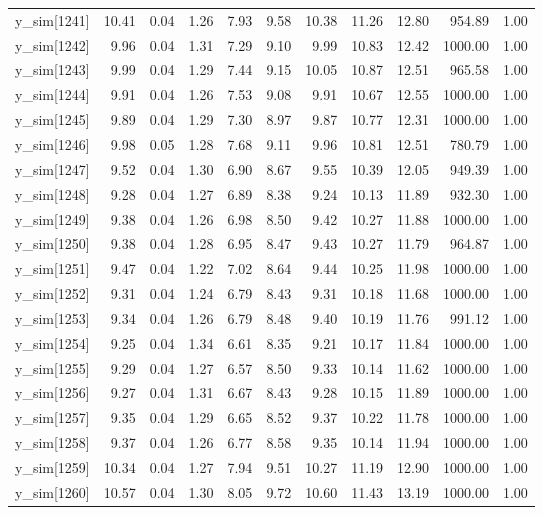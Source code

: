 \begin{table}[ht]
\begin{tabular}{rrrrrrrrrrr}
  y\_sim[1241] & 10.41 & 0.04 & 1.26 & 7.93 & 9.58 & 10.38 & 11.26 & 12.80 & 954.89 & 1.00 \\ 
  y\_sim[1242] & 9.96 & 0.04 & 1.31 & 7.29 & 9.10 & 9.99 & 10.83 & 12.42 & 1000.00 & 1.00 \\ 
  y\_sim[1243] & 9.99 & 0.04 & 1.29 & 7.44 & 9.15 & 10.05 & 10.87 & 12.51 & 965.58 & 1.00 \\ 
  y\_sim[1244] & 9.91 & 0.04 & 1.26 & 7.53 & 9.08 & 9.91 & 10.67 & 12.55 & 1000.00 & 1.00 \\ 
  y\_sim[1245] & 9.89 & 0.04 & 1.29 & 7.30 & 8.97 & 9.87 & 10.77 & 12.31 & 1000.00 & 1.00 \\ 
  y\_sim[1246] & 9.98 & 0.05 & 1.28 & 7.68 & 9.11 & 9.96 & 10.81 & 12.51 & 780.79 & 1.00 \\ 
  y\_sim[1247] & 9.52 & 0.04 & 1.30 & 6.90 & 8.67 & 9.55 & 10.39 & 12.05 & 949.39 & 1.00 \\ 
  y\_sim[1248] & 9.28 & 0.04 & 1.27 & 6.89 & 8.38 & 9.24 & 10.13 & 11.89 & 932.30 & 1.00 \\ 
  y\_sim[1249] & 9.38 & 0.04 & 1.26 & 6.98 & 8.50 & 9.42 & 10.27 & 11.88 & 1000.00 & 1.00 \\ 
  y\_sim[1250] & 9.38 & 0.04 & 1.28 & 6.95 & 8.47 & 9.43 & 10.27 & 11.79 & 964.87 & 1.00 \\ 
  y\_sim[1251] & 9.47 & 0.04 & 1.22 & 7.02 & 8.64 & 9.44 & 10.25 & 11.98 & 1000.00 & 1.00 \\ 
  y\_sim[1252] & 9.31 & 0.04 & 1.24 & 6.79 & 8.43 & 9.31 & 10.18 & 11.68 & 1000.00 & 1.00 \\ 
  y\_sim[1253] & 9.34 & 0.04 & 1.26 & 6.79 & 8.48 & 9.40 & 10.19 & 11.76 & 991.12 & 1.00 \\ 
  y\_sim[1254] & 9.25 & 0.04 & 1.34 & 6.61 & 8.35 & 9.21 & 10.17 & 11.84 & 1000.00 & 1.00 \\ 
  y\_sim[1255] & 9.29 & 0.04 & 1.27 & 6.57 & 8.50 & 9.33 & 10.14 & 11.62 & 1000.00 & 1.00 \\ 
  y\_sim[1256] & 9.27 & 0.04 & 1.31 & 6.67 & 8.43 & 9.28 & 10.15 & 11.89 & 1000.00 & 1.00 \\ 
  y\_sim[1257] & 9.35 & 0.04 & 1.29 & 6.65 & 8.52 & 9.37 & 10.22 & 11.78 & 1000.00 & 1.00 \\ 
  y\_sim[1258] & 9.37 & 0.04 & 1.26 & 6.77 & 8.58 & 9.35 & 10.14 & 11.94 & 1000.00 & 1.00 \\ 
  y\_sim[1259] & 10.34 & 0.04 & 1.27 & 7.94 & 9.51 & 10.27 & 11.19 & 12.90 & 1000.00 & 1.00 \\ 
  y\_sim[1260] & 10.57 & 0.04 & 1.30 & 8.05 & 9.72 & 10.60 & 11.43 & 13.19 & 1000.00 & 1.00 \\ 

\end{tabular}
\end{table}
